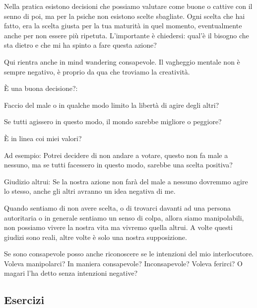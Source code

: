 \documentclass[12pt]{book} %
\begin{document}
\bigskip

Nella pratica esistono decisioni che possiamo valutare come buone o cattive con il senno di poi, ma per la psiche non
esistono scelte sbagliate. Ogni scelta che hai fatto, era la scelta giusta per la tua maturità in quel momento,
eventualmente anche per non essere più ripetuta. L'importante è chiedersi: qual'è il bisogno che sta dietro e che mi ha
spinto a fare questa azione?


\bigskip

Qui rientra anche in mind wandering consapevole. Il vagheggio mentale non è sempre negativo, è proprio da qua che
troviamo la creatività.


\bigskip

È una buona decisione?: 

Faccio del male o in qualche modo limito la libertà di agire degli altri? 

Se tutti agissero in questo modo, il mondo sarebbe migliore o peggiore? 

È in linea coi miei valori?

Ad esempio: Potrei decidere di non andare a votare, questo non fa male a nessuno, ma se tutti facessero in questo modo,
sarebbe una scelta positiva?


\bigskip

Giudizio altrui: Se la nostra azione non farà del male a nessuno dovremmo agire lo stesso, anche gli altri avranno un
idea negativa di me.


\bigskip

Quando sentiamo di non avere scelta, o di trovarci davanti ad una persona autoritaria o in generale sentiamo un senso di
colpa, allora siamo manipolabili, non possiamo vivere la nostra vita ma vivremo quella altrui. A volte questi giudizi
sono reali, altre volte è solo una nostra supposizione.


\bigskip

Se sono consapevole posso anche riconoscere se le intenzioni del mio interlocutore. Voleva manipolarci? In maniera
consapevole? Inconsapevole? Voleva ferirci? O magari l'ha detto senza intenzioni negative?


\bigskip


\bigskip

\clearpage\subsection{Esercizi}
\end{document}
